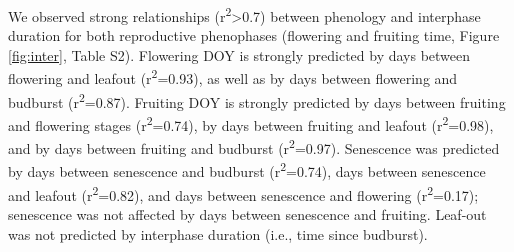 \documentclass{article}
\begin{document}
\par We observed strong relationships (r\textsuperscript{2}>0.7) between phenology and interphase duration for both reproductive phenophases (flowering and fruiting time, Figure \ref{fig:inter}, Table S2). Flowering DOY is strongly predicted by days between flowering and leafout (r\textsuperscript{2}=0.93), as well as by days between flowering and budburst (r\textsuperscript{2}=0.87). Fruiting DOY is strongly predicted by days between fruiting and flowering stages (r\textsuperscript{2}=0.74), by days between fruiting and leafout (r\textsuperscript{2}=0.98), and by days between fruiting and budburst (r\textsuperscript{2}=0.97). Senescence was predicted by days between senescence and budburst (r\textsuperscript{2}=0.74), days between senescence and leafout (r\textsuperscript{2}=0.82), and days between senescence and flowering (r\textsuperscript{2}=0.17); senescence was not affected by days between senescence and fruiting.  Leaf-out was not predicted by interphase duration (i.e., time since budburst). 
\end{document}
